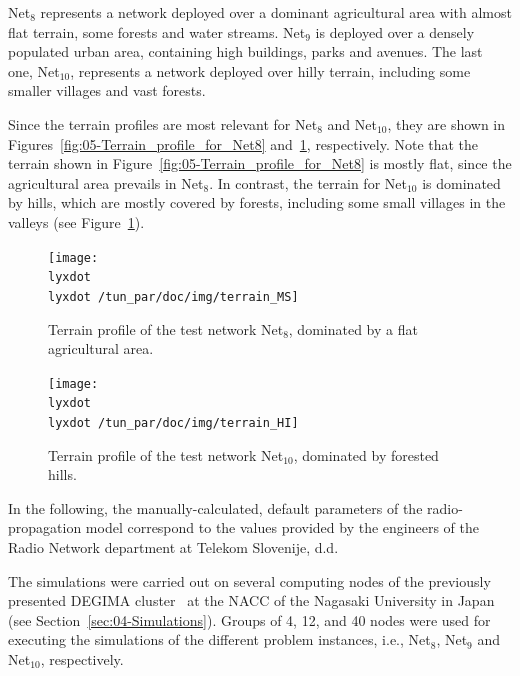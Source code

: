 Net$_{8}$ represents a network deployed over a dominant agricultural
area with almost flat terrain, some forests and water streams. Net$_{9}$
is deployed over a densely populated urban area, containing high buildings,
parks and avenues. The last one, Net$_{10}$, represents a network
deployed over hilly terrain, including some smaller villages and vast
forests.

Since the terrain profiles are most relevant for Net$_{8}$ and Net$_{10}$,
they are shown in Figures~\ref{fig:05-Terrain_profile_for_Net8}
and~\ref{fig:05-Terrain_profile_for_Net10}, respectively. Note that
the terrain shown in Figure~\ref{fig:05-Terrain_profile_for_Net8}
is mostly flat, since the agricultural area prevails in Net$_{8}$.
In contrast, the terrain for Net$_{10}$ is dominated by hills, which
are mostly covered by forests, including some small villages in the
valleys (see Figure~\ref{fig:05-Terrain_profile_for_Net10}).

\begin{figure}
\begin{minipage}[t]{0.49\textwidth}%
\centering

\texttt{[image: \\lyxdot \\lyxdot /tun\_par/doc/img/terrain\_MS]}

\caption{Terrain profile of the test network Net$_{8}$, dominated by a flat
agricultural area. \label{fig:05-Terrain_profile_for_Net8}}
%
\end{minipage}\hfill{}%
\begin{minipage}[t]{0.49\textwidth}%
\centering

\texttt{[image: \\lyxdot \\lyxdot /tun\_par/doc/img/terrain\_HI]}

\caption{Terrain profile of the test network Net$_{10}$, dominated by forested
hills. \label{fig:05-Terrain_profile_for_Net10}}
%
\end{minipage}
\end{figure}


In the following, the manually-calculated, default parameters of the
radio-propagation model correspond to the values provided by the engineers
of the Radio Network department at Telekom Slovenije, d.d.

\bigskip{}


The simulations were carried out on several computing nodes of the
previously presented DEGIMA cluster~\cite{Hamada_Cluster_of_GPUs:2010}
at the NACC of the Nagasaki University in Japan (see Section~\ref{sec:04-Simulations}).
Groups of 4, 12, and 40 nodes were used for executing the simulations
of the different problem instances, i.e., Net$_{8}$, Net$_{9}$ and
Net$_{10}$, respectively.



